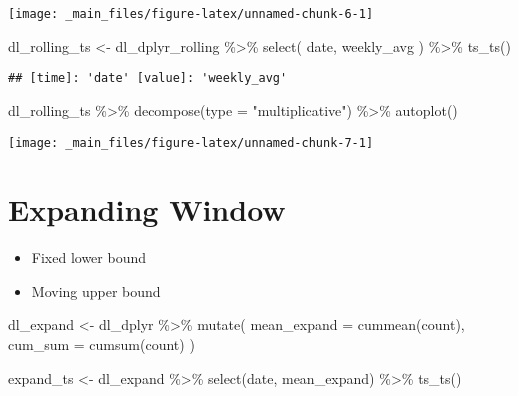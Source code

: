 \documentclass[
]{book}
\newenvironment{Shaded}{\begin{snugshade}}{\end{snugshade}}
\newcommand{\AttributeTok}[1]{\textcolor[rgb]{0.77,0.63,0.00}{#1}}
\newcommand{\FunctionTok}[1]{\textcolor[rgb]{0.00,0.00,0.00}{#1}}
\newcommand{\NormalTok}[1]{#1}
\newcommand{\OtherTok}[1]{\textcolor[rgb]{0.56,0.35,0.01}{#1}}
\newcommand{\SpecialCharTok}[1]{\textcolor[rgb]{0.00,0.00,0.00}{#1}}
\newcommand{\StringTok}[1]{\textcolor[rgb]{0.31,0.60,0.02}{#1}}
\providecommand{\tightlist}{%
  \setlength{\itemsep}{0pt}\setlength{\parskip}{0pt}}
\begin{document}
\begin{center}\texttt{[image: \_main\_files/figure-latex/unnamed-chunk-6-1]} \end{center}

\begin{Shaded}
\begin{Highlighting}[]
\NormalTok{dl\_rolling\_ts }\OtherTok{\textless{}{-}}\NormalTok{ dl\_dplyr\_rolling }\SpecialCharTok{\%\textgreater{}\%}
  \FunctionTok{select}\NormalTok{(}
\NormalTok{    date, weekly\_avg}
\NormalTok{  ) }\SpecialCharTok{\%\textgreater{}\%}
  \FunctionTok{ts\_ts}\NormalTok{()}
\end{Highlighting}
\end{Shaded}

\begin{verbatim}
## [time]: 'date' [value]: 'weekly_avg'
\end{verbatim}

\begin{Shaded}
\begin{Highlighting}[]
\NormalTok{dl\_rolling\_ts }\SpecialCharTok{\%\textgreater{}\%}
  \FunctionTok{decompose}\NormalTok{(}\AttributeTok{type =} \StringTok{"multiplicative"}\NormalTok{) }\SpecialCharTok{\%\textgreater{}\%}
  \FunctionTok{autoplot}\NormalTok{()}
\end{Highlighting}
\end{Shaded}

\begin{center}\texttt{[image: \_main\_files/figure-latex/unnamed-chunk-7-1]} \end{center}

\hypertarget{expanding-window}{%
\chapter{Expanding Window}\label{expanding-window}}

\begin{itemize}
\tightlist
\item
  Fixed lower bound
\item
  Moving upper bound
\end{itemize}

\begin{Shaded}
\begin{Highlighting}[]
\NormalTok{dl\_expand }\OtherTok{\textless{}{-}}\NormalTok{ dl\_dplyr }\SpecialCharTok{\%\textgreater{}\%} 
  \FunctionTok{mutate}\NormalTok{(}
    \AttributeTok{mean\_expand =} \FunctionTok{cummean}\NormalTok{(count),}
    \AttributeTok{cum\_sum =} \FunctionTok{cumsum}\NormalTok{(count)}
\NormalTok{  )}

\NormalTok{expand\_ts }\OtherTok{\textless{}{-}}\NormalTok{ dl\_expand }\SpecialCharTok{\%\textgreater{}\%} 
  \FunctionTok{select}\NormalTok{(date, mean\_expand) }\SpecialCharTok{\%\textgreater{}\%} 
  \FunctionTok{ts\_ts}\NormalTok{()}
\end{Highlighting}
\end{Shaded}
\end{document}
